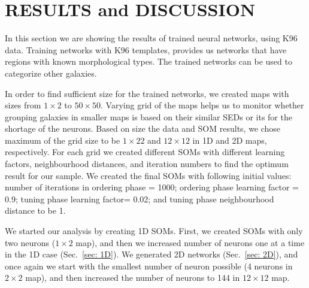 \section{RESULTS and DISCUSSION}
\label{sec: result}

    In this section we are showing the results of trained neural networks, using K96 data.
    Training networks with K96 templates, provides us networks that have regions with known morphological types. The trained networks can be used to categorize other galaxies.
    
    In order to find sufficient size for the trained networks, we created maps with sizes from $1\times2$ to $50\times50$.
    Varying grid of the maps helps us to monitor whether grouping galaxies in smaller maps is based on their similar SEDs or its for the shortage of the neurons.
    Based on size the data and SOM results, we chose maximum of the grid size to be $1\times22$ and $12\times12$ in 1D and 2D maps, respectively. 
    For each grid we created different SOMs with different learning factors, neighbourhood distances, and iteration numbers to find the optimum result for our sample.
    We created the final SOMs with following initial values: number of iterations in ordering phase = 1000; ordering phase learning factor = 0.9; tuning phase learning factor= 0.02; and tuning phase neighbourhood distance to be 1.
   
    We started our analysis by creating 1D SOMs. 
    First, we created SOMs with only two neurons ($1\times2$ map), and then we increased number of neurons one at a time in the 1D case (Sec.~\ref{sec: 1D}).
    We generated 2D networks (Sec.~\ref{sec: 2D}), and once again we start with the smallest number of neuron possible (4 neurons in $2\times2$ map), and then increased the number of neurons to 144 in $12\times12$ map.
    
